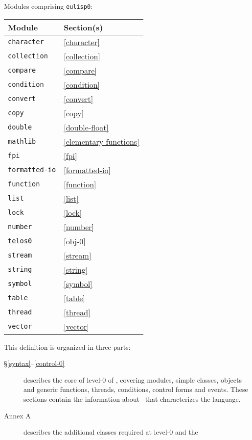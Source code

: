 \begin{optDefinition}
Modules comprising {\tt eulisp0}:
\begin{center}
    \label{level-0-modules}
    \begin{tabular}{|ll|}\hline
        Module & Section(s)\\\hline
        {\tt character} & \ref{character}\\
        {\tt collection} & \ref{collection}\\
        {\tt compare} & \ref{compare}\\
        {\tt condition} & \ref{condition}\\
        {\tt convert} & \ref{convert}\\
        {\tt copy} & \ref{copy}\\
        {\tt double} & \ref{double-float}\\
        {\tt mathlib} & \ref{elementary-functions}\\
        {\tt fpi} & \ref{fpi}\\
        {\tt formatted-io} & \ref{formatted-io}\\
        {\tt function} & \ref{function}\\
        {\tt list} & \ref{list}\\
        {\tt lock} & \ref{lock}\\
        {\tt number} & \ref{number}\\
        {\tt telos0} & \ref{obj-0}\\
        {\tt stream} & \ref{stream}\\
        {\tt string} & \ref{string}\\
        {\tt symbol} & \ref{symbol}\\
        {\tt table} & \ref{table}\\
        {\tt thread} & \ref{thread}\\
        {\tt vector} & \ref{vector}\\\hline
    \end{tabular}
\end{center}
%
\noindent
This definition is organized in three parts:
\begin{description}
    \item[\S \ref{syntax}--\ref{control-0}] describes the core of level-0
    of \eulisp, covering modules, simple classes, objects and generic functions,
    threads, conditions, control forms and events.  These sections contain the
    information about \eulisp\ that characterizes the language.
    \item[Annex A] describes the additional classes required at level-0 and the

\end{description}
\end{optDefinition}
